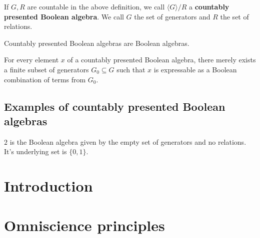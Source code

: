 \documentclass{../util/zariski-small}
\begin{document}
\begin{definition}
  If $G,R$ are countable in the above definition, we call $\langle G \rangle /R$ 
  a \textbf{countably presented Boolean algebra}. 
  We call $G$ the set of generators and $R$ the set of relations. 
\end{definition}
\begin{remark}
  Countably presented Boolean algebras are Boolean algebras. 
\end{remark}
\begin{remark}
  For every element $x$ of a countably presented Boolean algebra, 
  there merely exists a finite subset of generators $G_0\subseteq G$ such that $x$ is expressable 
  as a Boolean combination of terms from $G_0$. 
\end{remark}

\subsection{Examples of countably presented Boolean algebras}
\begin{example}
  \item $2$ is the Boolean algebra given by the empty set of generators and no relations. 
    It's underlying set is $\{0,1\}$. 
\end{example}
\begin{example}

\end{example}




%



\appendix
{}
\section*{Introduction}

%

\section{Omniscience principles}

\end{document}
